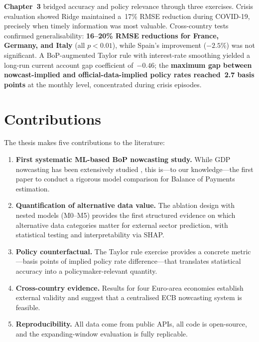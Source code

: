 \textbf{Chapter~3} bridged accuracy and policy relevance through three exercises.  Crisis evaluation showed Ridge maintained a~17\% RMSE reduction during COVID-19, precisely when timely information was most valuable.  Cross-country tests confirmed generalisability: \textbf{16--20\% RMSE reductions for France, Germany, and Italy} (all $p < 0.01$), while Spain's improvement ($-2.5$\%) was not significant.  A BoP-augmented Taylor rule with interest-rate smoothing yielded a long-run current account gap coefficient of~$-0.46$; the \textbf{maximum gap between nowcast-implied and official-data-implied policy rates reached~2.7 basis points} at the monthly level, concentrated during crisis episodes.


\section*{Contributions}

The thesis makes five contributions to the literature:

\begin{enumerate}
  \item \textbf{First systematic ML-based BoP nowcasting study.}  While GDP nowcasting has been extensively studied \citep{giannone2008nowcasting, bok2018macroeconomic}, this is---to our knowledge---the first paper to conduct a rigorous model comparison for Balance of Payments estimation.

  \item \textbf{Quantification of alternative data value.}  The ablation design with nested models (M0--M5) provides the first structured evidence on which alternative data categories matter for external sector prediction, with statistical testing and interpretability via SHAP.

  \item \textbf{Policy counterfactual.}  The Taylor rule exercise provides a concrete metric---basis points of implied policy rate difference---that translates statistical accuracy into a policymaker-relevant quantity.

  \item \textbf{Cross-country evidence.}  Results for four Euro-area economies establish external validity and suggest that a centralised ECB nowcasting system is feasible.

  \item \textbf{Reproducibility.}  All data come from public APIs, all code is open-source, and the expanding-window evaluation is fully replicable.
\end{enumerate}


